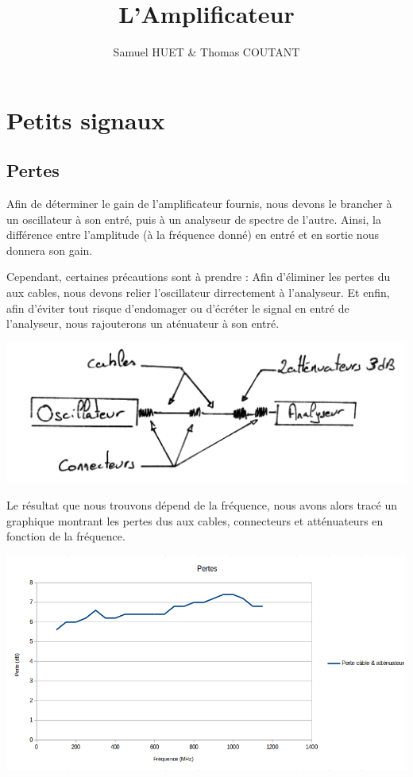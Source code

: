 \documentclass[a4paper,12pt]{report}            %
\author{Samuel HUET \& Thomas COUTANT}
\title{\huge{\textbf{L'Amplificateur}}}
\begin{document}
\maketitle
\renewcommand{\contentsname}{SOMMAIRE} %
\tableofcontents

\chapter{Petits signaux}

\section{Pertes}

Afin de déterminer le gain de l'amplificateur fournis, nous devons le brancher 
à un oscillateur à son entré, puis à un analyseur de spectre de l'autre. Ainsi, 
la différence entre l'amplitude (à la fréquence donné) en entré et en sortie nous 
donnera son gain. 

Cependant, certaines précautions sont à prendre : Afin d'éliminer les pertes du aux cables, 
nous devons relier l'oscillateur dirrectement à l'analyseur. Et enfin, afin d'éviter
tout risque d'endomager ou d'écréter le signal en entré de l'analyseur, nous rajouterons
un aténuateur à son entré.

\begin{center}\includegraphics[scale = 0.25]{pic/perte_cables.png}\\ \end{center}

Le résultat que nous trouvons dépend de la fréquence, nous avons alors tracé un graphique
montrant les pertes dus aux cables, connecteurs et atténuateurs en fonction de la fréquence.

\begin{center}\includegraphics[scale = 0.4]{pic/perte_graph.png}\\ \end{center}
\end{document}
